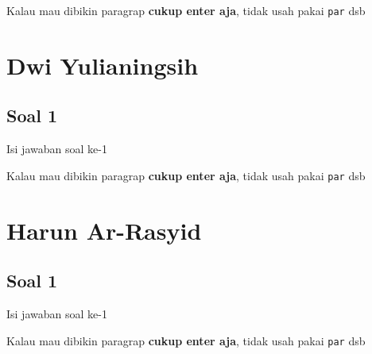 Kalau mau dibikin paragrap \textbf{cukup enter aja}, tidak usah pakai \verb|par| dsb



\section{Dwi Yulianingsih}
\subsection{Soal 1}
Isi jawaban soal ke-1

Kalau mau dibikin paragrap \textbf{cukup enter aja}, tidak usah pakai \verb|par| dsb



\section{Harun Ar-Rasyid}
\subsection{Soal 1}
Isi jawaban soal ke-1

Kalau mau dibikin paragrap \textbf{cukup enter aja}, tidak usah pakai \verb|par| dsb



